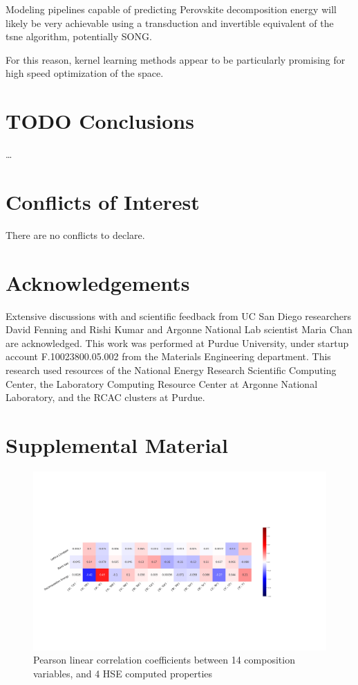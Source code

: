 \documentclass[twoside, twocolumn, 9pt, draft]{article}
\begin{document}
Modeling pipelines capable of predicting Perovskite decomposition
energy will likely be very achievable using a transduction and
invertible equivalent of the \gls{tsne} algorithm,
potentially SONG.

For this reason, kernel learning methods appear to be particularly
promising for high speed optimization of the space.

\section*{{\bfseries\sffamily TODO} Conclusions}
\label{sec:orga3c2451}
\ldots{}\\

\section*{Conflicts of Interest}
\label{sec:orgdb135d6}
There are no conflicts to declare.

\section*{Acknowledgements}
\label{sec:orgcdc6b4e}
Extensive discussions with and scientific feedback from UC San Diego
researchers David Fenning and Rishi Kumar and Argonne National Lab
scientist Maria Chan are acknowledged. This work was performed at
Purdue University, under startup account F.10023800.05.002 from the
Materials Engineering department. This research used resources of the
National Energy Research Scientific Computing Center, the Laboratory
Computing Resource Center at Argonne National Laboratory, and the RCAC
clusters at Purdue.



\section*{Supplemental Material}
\label{sec:org4edc854}
\printglossaries

\begin{figure}
\centering
\includegraphics[width=.9\linewidth]{HSE_v_comp_pearson2.png}
\caption{\label{fig:pearson_hcomp} Pearson linear correlation coefficients between 14 composition variables, and 4 HSE computed properties}
\end{figure}
\end{document}
